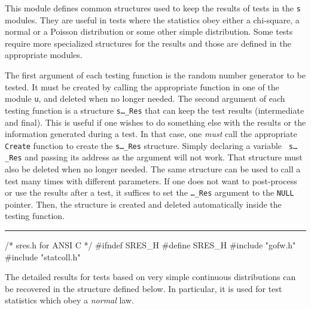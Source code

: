 
This module defines common structures used to keep the results of tests
in the {\tt s} modules. They are useful in tests where the statistics
obey either a chi-square, a normal or a Poisson distribution or some other
simple distribution. Some tests require more specialized structures for
the results and those are defined in the appropriate modules.

The first argument of each testing function is the random number generator 
to be tested. It must be created by calling the appropriate function
in one of the module {\tt u}, and deleted when no longer needed.
The second argument of each testing function is a structure 
{\tt s\ldots\_Res} that can keep the test results (intermediate and final).
This is useful if one wishes to do something else with the
results or the information generated during a test. In that case, one 
{\it must} call the appropriate {\tt Create} function to create the
 {\tt s\ldots\_Res} structure. Simply declaring a variable  {\tt
s\ldots\_Res} and passing its address as the argument will not work.
That structure must also be deleted when no longer needed.
The same structure can
be used to call a test many times with different parameters.
If one does not want to post-process or use the results after a test,
it suffices to set the {\tt \ldots\_Res} argument to the {\tt NULL} pointer.
Then, the structure is created and deleted automatically inside the 
testing function.


\bigskip\hrule
\code\hide
/* sres.h  for ANSI C */
#ifndef SRES_H
#define SRES_H
\endhide
#include "gofw.h"
#include "statcoll.h"
\endcode




The detailed results for tests based on very simple continuous
distributions can be recovered in the structure defined below. In
 particular, it is used for test statistics which obey a {\em normal\/} law.

\code


